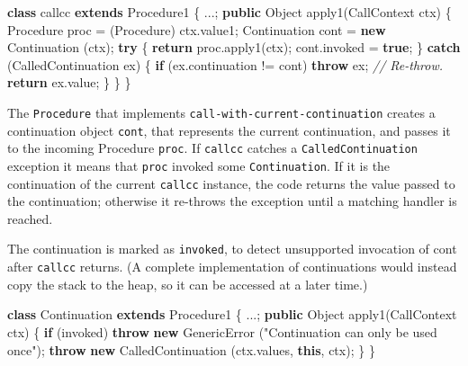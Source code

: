 \documentclass[12pt,a4paper,oneside,openright]{book}
\newenvironment{Shaded}{\begin{snugshade}}{\end{snugshade}}
\newcommand{\KeywordTok}[1]{\textcolor[rgb]{0.13,0.29,0.53}{\textbf{{#1}}}}
\newcommand{\StringTok}[1]{\textcolor[rgb]{0.31,0.60,0.02}{{#1}}}
\newcommand{\CommentTok}[1]{\textcolor[rgb]{0.56,0.35,0.01}{\textit{{#1}}}}
\newcommand{\FunctionTok}[1]{\textcolor[rgb]{0.00,0.00,0.00}{{#1}}}
\newcommand{\NormalTok}[1]{{#1}}
\begin{document}
\begin{Shaded}
\begin{Highlighting}[]
    \KeywordTok{class} \NormalTok{callcc }\KeywordTok{extends} \NormalTok{Procedure1 \{}
        \NormalTok{...;}
        \KeywordTok{public} \NormalTok{Object }\FunctionTok{apply1}\NormalTok{(CallContext ctx) \{}
            \NormalTok{Procedure proc = (Procedure) ctx.}\FunctionTok{value1}\NormalTok{;}
            \NormalTok{Continuation cont}
                \NormalTok{= }\KeywordTok{new} \FunctionTok{Continuation} \NormalTok{(ctx);}
            \KeywordTok{try} \NormalTok{\{}
                \KeywordTok{return} \NormalTok{proc.}\FunctionTok{apply1}\NormalTok{(ctx);}
                \NormalTok{cont.}\FunctionTok{invoked} \NormalTok{= }\KeywordTok{true}\NormalTok{;}
            \NormalTok{\} }\KeywordTok{catch} \NormalTok{(CalledContinuation ex) \{}
                \KeywordTok{if} \NormalTok{(ex.}\FunctionTok{continuation} \NormalTok{!= cont)}
                    \KeywordTok{throw} \NormalTok{ex;  }\CommentTok{// Re-throw.}
                \KeywordTok{return} \NormalTok{ex.}\FunctionTok{value}\NormalTok{;}
            \NormalTok{\}}
        \NormalTok{\}}
    \NormalTok{\}}
\end{Highlighting}
\end{Shaded}

The \texttt{Procedure} that implements
\texttt{call-with-current-continuation} creates a continuation object
\texttt{cont}, that represents the current continuation, and passes it
to the incoming Procedure \texttt{proc}. If \texttt{callcc} catches a
\texttt{CalledContinuation} exception it means that \texttt{proc}
invoked some \texttt{Continuation}. If it is the continuation of the
current \texttt{callcc} instance, the code returns the value passed to
the continuation; otherwise it re-throws the exception until a matching
handler is reached.

The continuation is marked as \texttt{invoked}, to detect unsupported
invocation of cont after \texttt{callcc} returns. (A complete
implementation of continuations would instead copy the stack to the
heap, so it can be accessed at a later time.)

\begin{Shaded}
\begin{Highlighting}[]
    \KeywordTok{class} \NormalTok{Continuation }\KeywordTok{extends} \NormalTok{Procedure1 \{}
        \NormalTok{...;}
        \KeywordTok{public} \NormalTok{Object }\FunctionTok{apply1}\NormalTok{(CallContext ctx) \{}
            \KeywordTok{if} \NormalTok{(invoked)}
                \KeywordTok{throw} \KeywordTok{new} \NormalTok{GenericError}
                    \NormalTok{(}\StringTok{"Continuation can only be used once"}\NormalTok{);}
            \KeywordTok{throw} \KeywordTok{new} \FunctionTok{CalledContinuation} \NormalTok{(ctx.}\FunctionTok{values}\NormalTok{, }\KeywordTok{this}\NormalTok{, ctx);}
        \NormalTok{\}}
    \NormalTok{\}}
\end{Highlighting}
\end{Shaded}
\end{document}
